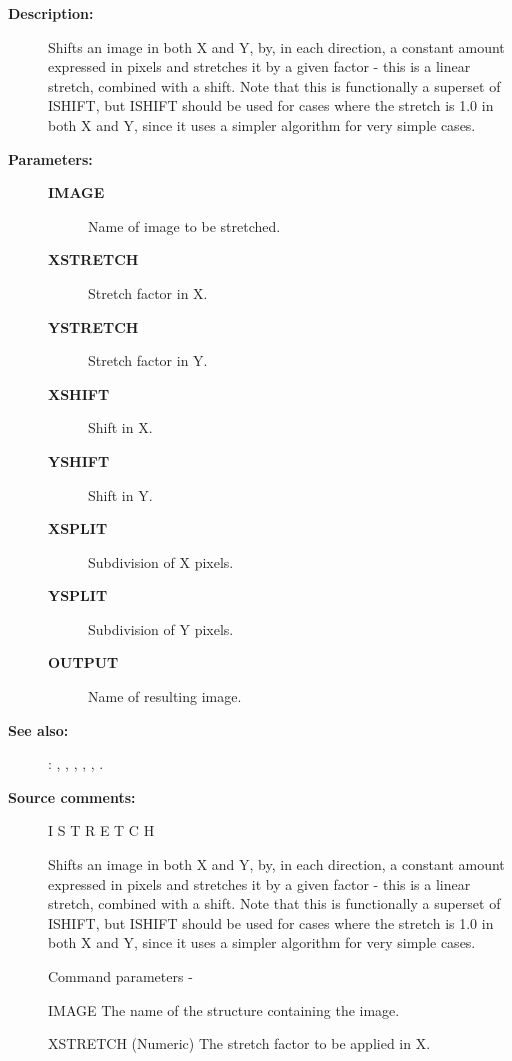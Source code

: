 \begin{description}
\begin{description}
\item [\textbf{Description:}]
 Shifts an image in both X and Y, by, in each direction,
 a constant amount expressed in pixels and stretches it
 by a given factor - this is a linear stretch, combined
 with a shift.  Note that this is functionally a superset
 of ISHIFT, but ISHIFT should be used for cases where the
 stretch is 1.0 in both X and Y, since it uses a simpler
 algorithm for very simple cases.

\item [\textbf{Parameters:}]
\begin{description}
\item [\textbf{IMAGE}]
 Name of image to be stretched.
\item [\textbf{XSTRETCH}]
 Stretch factor in X.
\item [\textbf{YSTRETCH}]
 Stretch factor in Y.
\item [\textbf{XSHIFT}]
 Shift in X.
\item [\textbf{YSHIFT}]
 Shift in Y.
\item [\textbf{XSPLIT}]
 Subdivision of X pixels.
\item [\textbf{YSPLIT}]
 Subdivision of Y pixels.
\item [\textbf{OUTPUT}]
 Name of resulting image.
\end{description}

\item [\textbf{See also:}]
: , , , , , .\\

\item [\textbf{Source comments:}]
\begin{terminalv}
 I S T R E T C H

 Shifts an image in both X and Y, by, in each direction,
 a constant amount expressed in pixels and stretches it
 by a given factor - this is a linear stretch, combined
 with a shift.  Note that this is functionally a superset
 of ISHIFT, but ISHIFT should be used for cases where the
 stretch is 1.0 in both X and Y, since it uses a simpler
 algorithm for very simple cases.

 Command parameters -

 IMAGE    The name of the structure containing the image.

 XSTRETCH (Numeric) The stretch factor to be applied in X.


\end{terminalv}
\end{description}
\end{description}
